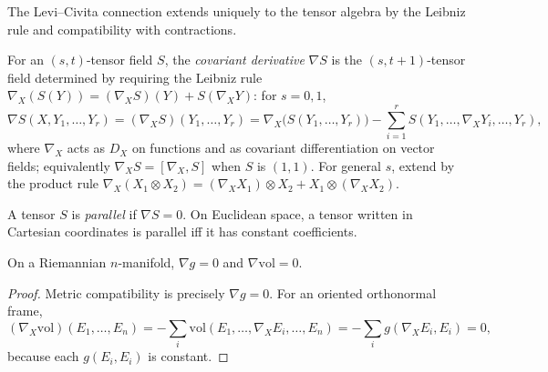 The Levi--Civita connection extends uniquely to the tensor algebra by the
Leibniz rule and compatibility with contractions.

\begin{definition}
  \label{def:pet-ch2-covariant-derivative-tensor}
  \leanok
  For an $(s,t)$-tensor field $S$, the \emph{covariant derivative} $\nabla S$
  is the $(s,t+1)$-tensor field determined by requiring the Leibniz rule
  $\nabla_X(S(Y))=(\nabla_XS)(Y)+S(\nabla_XY)$: for $s=0,1$,
  \[
    \nabla S(X,Y_1,\dots,Y_r)=(\nabla_XS)(Y_1,\dots,Y_r)
    =\nabla_X\big(S(Y_1,\dots,Y_r)\big)-\sum_{i=1}^rS(Y_1,\dots,\nabla_XY_i,\dots,Y_r),
  \]
  where $\nabla_X$ acts as $D_X$ on functions and as covariant differentiation
  on vector fields; equivalently $\nabla_XS=[\nabla_X,S]$ when $S$ is
  $(1,1)$. For general $s$, extend by the product rule
  $\nabla_X(X_1\otimes X_2)=(\nabla_XX_1)\otimes X_2+X_1\otimes(\nabla_XX_2)$.
\end{definition}

\begin{definition}
  \label{def:pet-ch2-parallel-tensor}
  \leanok
  A tensor $S$ is \emph{parallel} if $\nabla S=0$. On Euclidean space, a
  tensor written in Cartesian coordinates is parallel iff it has constant
  coefficients.
\end{definition}

\begin{proposition}
  \label{prop:pet-ch2-metric-volume-parallel}
  \leanok
  On a Riemannian $n$-manifold, $\nabla g=0$ and $\nabla\mathrm{vol}=0$.
\end{proposition}
\begin{proof}
  \leanok
  \sketch
  Metric compatibility is precisely
  $\nabla g=0$. For an oriented orthonormal frame,
  \[
    (\nabla_X\mathrm{vol})(E_1,\dots,E_n)
      =-\sum_i\mathrm{vol}(E_1,\dots,\nabla_XE_i,\dots,E_n)
      =-\sum_i g(\nabla_XE_i,E_i)=0,
  \]
  because each $g(E_i,E_i)$ is constant.
\end{proof}

